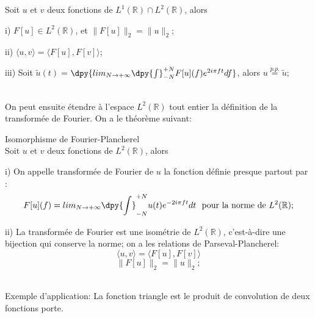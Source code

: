 \begin{thme}
Soit $u$ et $v$ deux fonctions de $L^1(\mathbb{R})\cap L^2(\mathbb{R})$, alors
\begin{description}
\item i) $ F[u] \in L^2(\mathbb{R})$, et $\|F[u]\|_2=\|u\|_2$;
\item ii) $\langle u,v \rangle=\langle F[u],F[v] \rangle$;
\item iii) Soit $\widetilde{u}(t)=$$\dpy{lim_{N\rightarrow+\infty}\dpy{\int}^{+N}_{-N}F[u](f)e^{2i\pi ft}df}$, alors $u\stackrel{p.p.}{=}\widetilde{u}$;
\end{description}
\end{thme}
~~\\
On peut ensuite étendre à l'espace $L^2(\mathbb{R})$ tout entier la définition de la transformée de Fourier. On a le théorème suivant:
~~\\
\begin{thme} Isomorphisme de Fourier-Plancherel
~~\\
Soit $u$ et $v$ deux fonctions de $L^2(\mathbb{R})$, alors
\begin{description}
\item i) On appelle transformée de Fourier de $u$ la fonction définie presque partout par :
$$F[u](f)=\displaystyle{lim_{N\rightarrow+\infty}\dpy{\int}^{+N}_{-N}u(t)e^{-2i\pi ft}dt}~~\text{pour\ la\ norme\ de\ } L^2(\mathbb{R});$$
\item ii) La transformée de Fourier est une isométrie de $L^2(\mathbb{R})$, c'est-à-dire une bijection qui conserve la norme; on a les relations de Parseval-Plancherel:
$$\langle u,v \rangle=\langle F[u],F[v] \rangle$$
$$\|F[u]\|_2=\|u\|_2;$$ 
\end{description}
\end{thme}
~~\\
Exemple d'application: La fonction triangle est le produit de convolution de deux fonctions porte.
~~\\

